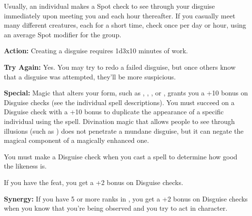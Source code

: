Usually, an individual makes a Spot check to see through your disguise immediately 
upon meeting you and each hour thereafter. If you casually meet many different 
creatures, each for a short time, check once per day or hour, using an average 
Spot modifier for the group. 

\textbf{Action:} Creating a disguise requires 1d3x10 minutes 
of work.

\textbf{Try Again:} Yes. You may try to redo a failed disguise, but once others 
know that a disguise was attempted, they'll be more suspicious.

\textbf{Special:} Magic that alters your form, such as , , , or , grants you a +10 bonus on Disguise checks 
(see the individual spell descriptions). You must succeed on a Disguise check with 
a +10 bonus to duplicate the appearance of a specific individual using the  spell. Divination magic that allows people to see through illusions (such as ) does not penetrate a mundane disguise, but it can negate the magical component 
of a magically enhanced one.

You must make a Disguise check when you cast a  spell to determine 
how good the likeness is.

If you have the  feat, you get a +2 bonus on Disguise checks.

\textbf{Synergy:} If you have 5 or more ranks in , you get a +2 bonus on Disguise 
checks when you know that you're being observed and you try to act in character.
